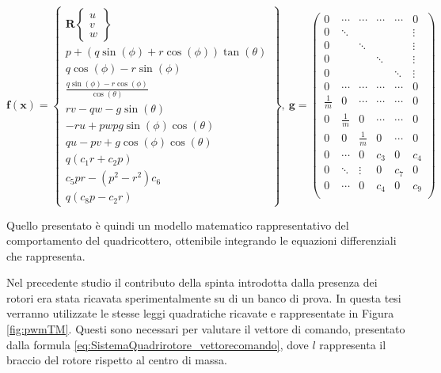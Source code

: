 \begin{equation}\label{eq:SistemaQuadrirotore_statespaceElement}
	\mathbf{f(x)} = \begin{Bmatrix}
		\mathbf{R} \begin{Bmatrix}
			u \\ v \\ w
		\end{Bmatrix} \\
		p + (q\sin(\phi)+r\cos(\phi))\tan(\theta) \\
		q\cos(\phi) - r\sin(\phi) \\
		\frac{q\sin(\phi) - r\cos(\phi)}{\cos(\theta)}\\
		rv-qw-g\sin(\theta)\\
		-ru + pw p g \sin(\phi)\cos(\theta)\\
		qu - pv + g \cos(\phi)\cos(\theta)\\
		q (c_1 r + c_2 p)\\
		c_5 pr - (p^2-r^2) c_6 \\
		q(c_8 p - c_2 r)
	\end{Bmatrix}, \ \mathbf{g} =
	\begin{pmatrix}
		0 & \cdots & \cdots & \cdots & \cdots & 0 \\
		0 & \ddots & & & & \vdots \\
		0 & & \ddots & & & \vdots \\
		0 & & & \ddots & & \vdots \\
		0 & & & & \ddots & \vdots \\
		0 & \cdots & \cdots & \cdots & \cdots & 0 \\
		\frac{1}{m} & 0 & \cdots & \cdots & \cdots & 0 \\
		0 & \frac{1}{m} & 0 & \cdots & \cdots & 0 \\
		0 & 0 & \frac{1}{m} & 0 & \cdots & 0 \\
		0 & \cdots & 0 & c_3 & 0 & c_4 \\
		0 & \ddots & \vdots & 0 & c_7 & 0 \\
		0 & \cdots & 0 & c_4 & 0 & c_9 \\
	\end{pmatrix}
\end{equation}

Quello presentato è quindi un modello matematico rappresentativo del comportamento del quadricottero, ottenibile integrando le equazioni differenziali che rappresenta.

Nel precedente studio il contributo della spinta introdotta dalla presenza dei rotori era stata ricavata sperimentalmente su di un banco di prova. In questa tesi verranno utilizzate le stesse leggi quadratiche ricavate e rappresentate in Figura \ref{fig:pwmTM}. Questi sono necessari per valutare il vettore di comando, presentato dalla formula \ref{eq:SistemaQuadrirotore_vettorecomando}, dove $l$ rappresenta il braccio del rotore rispetto al centro di massa.

